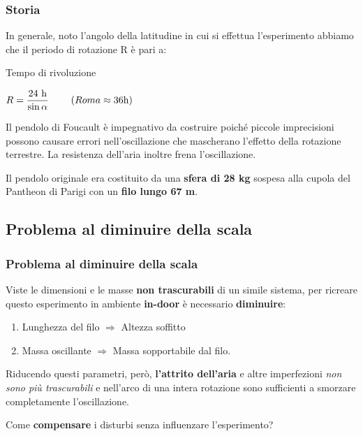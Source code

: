 \documentclass[
	10pt, %
]{beamer}
\begin{document}
\begin{frame}
	\frametitle{Storia}

	In generale, noto l'angolo della latitudine in cui si effettua l'esperimento abbiamo che il periodo di rotazione R è pari a:

	\begin{exampleblock}{Tempo di rivoluzione}
		\begin{center}
			${\displaystyle R={\frac {24\ \mathrm {h} }{\sin \alpha }}}\hspace{0.8cm}(Roma \approx 36 \mathrm {h})$
		\end{center}
	\end{exampleblock}

	Il pendolo di Foucault è impegnativo da costruire poiché piccole imprecisioni possono causare errori nell'oscillazione che mascherano l'effetto della rotazione terrestre. La resistenza dell'aria inoltre frena l'oscillazione.

	\bigskip

	Il pendolo originale era costituito da una \textbf{sfera di 28 kg} sospesa alla cupola del Pantheon di Parigi con un \textbf{filo lungo 67 m}.

\end{frame}

\subsection{Problema al diminuire della scala}

\begin{frame}
	\frametitle{Problema al diminuire della scala}
	Viste le dimensioni e le masse \textbf{non trascurabili} di un simile sistema, per ricreare questo esperimento in ambiente \textbf{in-door} è necessario \textbf{diminuire}:

	\bigskip

	\begin{enumerate}
		\item Lunghezza del filo $\Longrightarrow$ Altezza soffitto
		\item Massa oscillante $\Longrightarrow$ Massa sopportabile dal filo.
	\end{enumerate}

	\bigskip

	Riducendo questi parametri, però, \textbf{l'attrito dell'aria} e altre imperfezioni \textit{non sono più trascurabili} e nell'arco di una intera rotazione sono sufficienti a smorzare completamente l'oscillazione.

	\bigskip

	\begin{block}{} %
		\begin{center}
	 		Come \textbf{compensare} i disturbi senza influenzare l'esperimento?
		\end{center}
	\end{block}

\end{frame}
\end{document}
